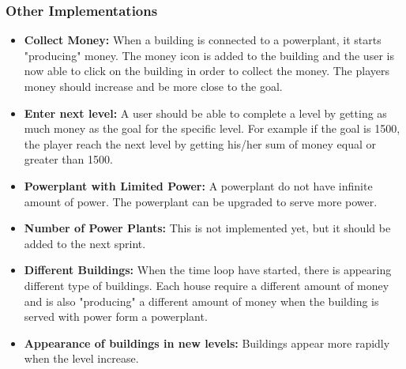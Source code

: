 	\subsubsection{Other Implementations}
		\begin{itemize}
			\item {\bf Collect Money: } When a building is connected to a powerplant, it starts
			"producing" money. The money icon is added to the building and the user is now
			able to click on the building in order to collect the money. The players money
			should increase and be more close to the goal. 
			\item {\bf Enter next level: } A user should be able to complete a level by getting
			as much money as the goal for the specific level. For example if the goal is 1500, the
			player reach the next level by getting his/her sum of money equal or greater than 1500.
			\item {\bf Powerplant with Limited Power: } A powerplant do not have infinite amount of
			power. The powerplant can be upgraded to serve more power. 
			\item {\bf Number of Power Plants: } This is not implemented yet, but it should be added
			to the next sprint. 
			\item {\bf Different Buildings: } When the time loop have started, there is appearing
			different type of buildings. Each house require a different amount of money and is
			also "producing" a different amount of money when the building is served with power
			form a powerplant. 
			\item {\bf Appearance of buildings in new levels: } Buildings appear more rapidly 
			when the level increase. 
		\end{itemize}
	
